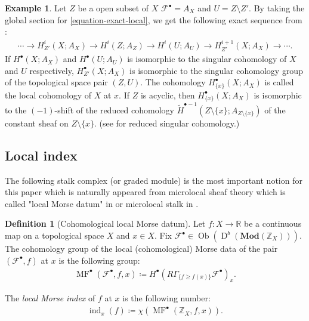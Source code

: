 \documentclass[a4paper,dvipdfmx,reqno,12pt]{amsart}
\theoremstyle{definition}
\newtheorem{definition}[theorem]{Definition}
\newtheorem{example}[theorem]{Example}
\newcommand{\deq}{\coloneqq}
\newcommand{\mcal}[1]{\mathcal{#1}}%
\newcommand{\opn}[1]{\operatorname{#1}}
\newcommand{\catn}[1]{\mathbf{#1}}
\numberwithin{equation}{section}
\begin{document}
\begin{example}
\label{example-local-cohomology}
Let $Z$ be a open subset of $X$ 
$\mathcal{F}^{\bullet}=A_{X}$ 
and $U=Z\setminus Z'$.
By taking the global 
section for \cref{equation-exact-local}, we get 
the following exact sequence from 
\cite[Proposition 2.3.9 (iv)]{MR1299726}:
\begin{align}
  \cdots \to H^{i}_{Z'}(X;A_X)\to
H^{i}(Z;A_{Z})\to H^{i}(U;A_U)\to 
H^{i+1}_{Z'}(X;A_X) \to \cdots.
\end{align}
If $H^{\bullet}(X;A_X)$ and $H^{\bullet}(U;A_U)$ 
is isomorphic to the singular cohomology of $X$ and $U$
respectively, $H^{\bullet}_{Z'}(X;A_X)$ is isomorphic to
the singular cohomology group of the topological space 
pair $(Z,U)$.
The cohomology $H^{\bullet}_{\{x\}}(X;A_X)$ is called
the local cohomology of $X$ at $x$.
If $Z$ is acyclic, then $H^{\bullet}_{\{x\}}(X;A_X)$ is 
isomorphic to the $(-1)$-shift of the reduced cohomology 
$\tilde{H}^{\bullet-1}(Z\setminus \{x\};
A_{Z\setminus \{x\}})$
of the constant sheaf on $Z\setminus \{x\}$.
(see 
\cite[p.199]{hatcherAlgebraicTopology2002a} for 
reduced singular cohomology.)
\end{example}

\subsection{Local index}

The following stalk complex (or graded module) is 
the most important notion
for this paper which is naturally appeared from 
microlocal sheaf theory 
which is called "local Morse datum" in \cite[p.271]{MR2031639} 
or microlocal stalk in \cite{MR4132582}.
\begin{definition}[{Cohomological local Morse datum}]
\label{definition-local-morse-data}
Let $f\colon X\to {\mathbb{R}}$ be a continuous map on a 
topological space $X$ and $x\in X$. Fix 
$\mathcal{F}^{\bullet}\in 
\opn{Ob}(\opn{D}^{b}(\catn{Mod}(\mathbb{Z}_X)))$.
The cohomology group of the local (cohomological) Morse 
data of the pair $(\mathcal{F}^{\bullet},f)$ at $x$ 
is the following group: 
\begin{align}
\opn{MF}^{\bullet}(\mcal{F}^{\bullet},f,x)\deq 
H^{\bullet}(R\Gamma_{\{f\geq f(x)\}}\mathcal{F}^{\bullet})_x.
\end{align}

The \emph{local Morse index} of $f$ at $x$ is the 
following number:
\begin{align} \label{equation-local-index}
\opn{ind}_x(f)\deq \chi(\opn{MF}^{\bullet}(\mathbb{Z}_X,f,x)).
\end{align}

\end{definition}
\end{document}
